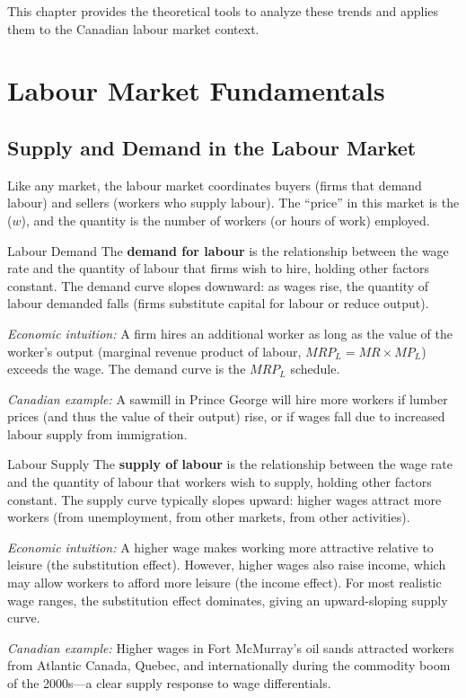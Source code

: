 This chapter provides the theoretical tools to analyze these trends and applies them to the Canadian labour market context.

\section{Labour Market Fundamentals}

\subsection{Supply and Demand in the Labour Market}

Like any market, the labour market coordinates buyers (firms that demand labour) and sellers (workers who supply labour). The ``price'' in this market is the  ($w$), and the quantity is the number of workers (or hours of work) employed.

\begin{defbox}{Labour Demand}
The \textbf{demand for labour} is the relationship between the wage rate and the quantity of labour that firms wish to hire, holding other factors constant. The demand curve slopes downward: as wages rise, the quantity of labour demanded falls (firms substitute capital for labour or reduce output).

\textit{Economic intuition:} A firm hires an additional worker as long as the value of the worker's output (marginal revenue product of labour, $MRP_L = MR \times MP_L$) exceeds the wage. The demand curve is the $MRP_L$ schedule.

\textit{Canadian example:} A sawmill in Prince George will hire more workers if lumber prices (and thus the value of their output) rise, or if wages fall due to increased labour supply from immigration.
\end{defbox}

\begin{defbox}{Labour Supply}
The \textbf{supply of labour} is the relationship between the wage rate and the quantity of labour that workers wish to supply, holding other factors constant. The supply curve typically slopes upward: higher wages attract more workers (from unemployment, from other markets, from other activities).

\textit{Economic intuition:} A higher wage makes working more attractive relative to leisure (the substitution effect). However, higher wages also raise income, which may allow workers to afford more leisure (the income effect). For most realistic wage ranges, the substitution effect dominates, giving an upward-sloping supply curve.

\textit{Canadian example:} Higher wages in Fort McMurray's oil sands attracted workers from Atlantic Canada, Quebec, and internationally during the commodity boom of the 2000s---a clear supply response to wage differentials.
\end{defbox}

